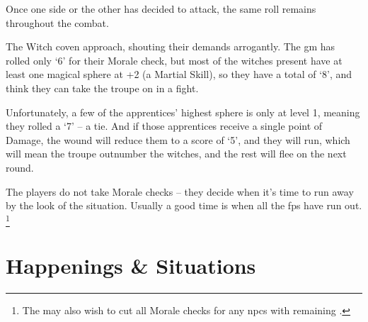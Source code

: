 \begin{multicols}{2}
Once one side or the other has decided to attack, the same roll remains throughout the combat.

\begin{exampletext}
  The Witch coven approach, shouting their demands arrogantly.
  The \gls{gm} has rolled only `6' for their Morale check, but most of the witches present have at least one magical sphere at +2 (a Martial Skill), so they have a total of `8', and think they can take the troupe on in a fight.

  Unfortunately, a few of the apprentices' highest sphere is only at level 1, meaning they rolled a `7' -- a tie.
  And if those apprentices receive a single point of Damage, the wound will reduce them to a score of `5', and they will run, which will mean the troupe outnumber the witches, and the rest will flee on the next round.
\end{exampletext}

The players do not take Morale checks -- they decide when it's time to run away by the look of the situation.
Usually a good time is when all the \glspl{fp} have run out.
\footnote{The  may also wish to cut all Morale checks for any \glspl{npc} with remaining .}

\end{multicols}

\section{Happenings \& Situations}

\encTownEvents

